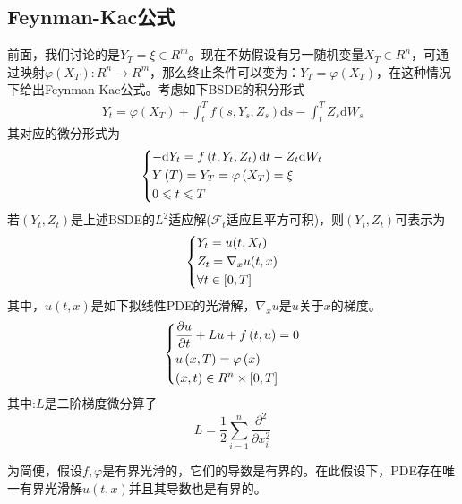 	\subsection{Feynman-Kac公式}
		\par
		前面，我们讨论的是${{Y_T} = \xi  \in {R^m}}$。现在不妨假设有另一随机变量${X_T} \in {R^n}$，可通过映射$\varphi ( {{X_T}}):{R^n} \rightarrow {R^m}$，那么终止条件可以变为：${Y_T} = \varphi ( {{X_T}} )$，在这种情况下给出Feynman-Kac公式。考虑如下BSDE的积分形式
		\begin{align*}
		{Y_t} = \varphi \left( {{X_T}} \right) + \int_t^T {f\left( {s,{Y_s},{Z_s}} \right){\mathrm{d}s} - } \int_t^T {{Z_s}\mathrm{d}{W_s}}
		\end{align*}
		其对应的微分形式为
		\begin{equation*}
			\centering
			\left\{\begin{lgathered}
			{ - \mathrm{d}{Y_t} = f\left( {t,{Y_t},{Z_t}} \right){\mathrm{d}t} - {Z_t}\mathrm{d}{W_t}}\\
			{Y\left( T \right) = {Y_T} = \varphi \left( {{X_T}} \right) = \xi }\\
			{0 \leqslant t \leqslant T}
			\end{lgathered} \right.
		\end{equation*}
		 若$(Y_t,Z_t)$是上述BSDE的$L^2$适应解(${{\mathcal {F}}_t}$适应且平方可积)，则$(Y_t,Z_t)$可表示为
		\begin{equation*}
			\centering
			\left\{\begin{lgathered}
			{Y_t} = u( {t,{X_t}} )\\
			{Z_t} = {\nabla _x}u( {t,x} )\\
			\forall t \in [ 0,T]
			\end{lgathered} \right.
		\end{equation*}
		 其中，$u(t,x)$是如下拟线性PDE的光滑解，${\nabla _x}u$是$u$关于$x$的梯度。
		\begin{equation*}
			\centering
			\left\{\begin{lgathered}
			{\frac{{\partial u}}{{\partial t}} + {Lu} + f\left( {t,u} \right) = 0}\\
			{u\left( {x,T} \right) = \varphi \left( x \right)}\\
			{\left( {x,t} \right) \in {R^n} \times \left[ {0,T} \right]}
			\end{lgathered} \right.
		\end{equation*}
		其中:$L$是二阶梯度微分算子
		\begin{equation*}
			L = \frac{1}{2}\sum\limits_{i = 1}^n {\frac{{{\partial ^2}}}{{\partial x_i^2}}}
		\end{equation*}
		\par
		为简便，假设$f,\varphi$是有界光滑的，它们的导数是有界的。在此假设下，PDE存在唯一有界光滑解$u(t,x)$并且其导数也是有界的。
